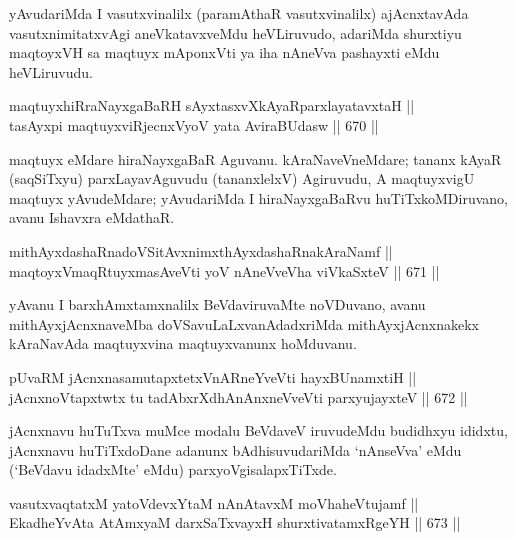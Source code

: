 \begin{artha} 
yAvudariMda I vasutxvinalilx (paramAthaR vasutxvinalilx) ajAcnxtavAda 
vasutxnimitatxvAgi aneVkatavxveMdu heVLiruvudo, adariMda shurxtiyu 
maqtoyxVH sa maqtuyx mAponxVti ya iha nAneVva pashayxti eMdu heVLiruvudu.
\end{artha}

\begin{shl}
maqtuyxhiRraNayxgaBaRH sAyxtasxvXkAyaRparxlayatavxtaH || \\
tasAyxpi maqtuyxviRjecnxVyoV yata AviraBUdasw \hfill || 670 ||  
\end{shl}

\begin{artha} 
maqtuyx eMdare hiraNayxgaBaR Aguvanu. kAraNaveVneMdare; tananx kAyaR 
(saqSiTxyu) parxLayavAguvudu (tananxlelxV) Agiruvudu, A maqtuyxvigU 
maqtuyx yAvudeMdare; yAvudariMda I hiraNayxgaBaRvu huTiTxkoMDiruvano, 
avanu Ishavxra eMdathaR.
\end{artha}

\begin{shl}
mithAyxdashaRnadoVSitAvxnimxthAyxdashaRnakAraNamf || \\
maqtoyxVmaqRtuyxmasAveVti yoV nAneVveVha viVkaSxteV \hfill || 671 ||  
\end{shl}

\begin{artha} 
yAvanu I barxhAmxtamxnalilx BeVdaviruvaMte noVDuvano, avanu 
mithAyxjAcnxnaveMba doVSavuLaLxvanAdadxriMda mithAyxjAcnxnakekx 
kAraNavAda maqtuyxvina maqtuyxvanunx hoMduvanu.
\end{artha}


\begin{shl}
pUvaRM jAcnxnasamutapxtetxVnARneYveVti hayxBUnamxtiH || \\
jAcnxnoVtapxtwtx tu tadAbxrXdhAnAnxneVveVti parxyujayxteV \hfill || 672 ||  
\end{shl}

\begin{artha} 
jAcnxnavu huTuTxva muMce modalu BeVdaveV iruvudeMdu budidhxyu ididxtu, 
jAcnxnavu huTiTxdoDane adanunx bAdhisuvudariMda `nAnseVva' eMdu 
(`BeVdavu idadxMte' eMdu) parxyoVgisalapxTiTxde.
\end{artha}


\begin{shl}
vasutxvaqtatxM yatoV\s devxYtaM nAnAtavxM moVhaheVtujamf || \\
EkadheYvAta AtAmx\s yaM darxSaTxvayxH shurxtivatamxRgeYH \hfill || 673 ||  
\end{shl}

